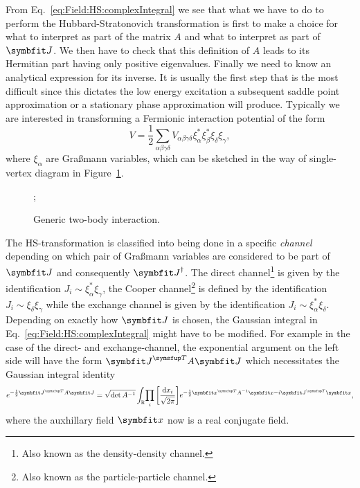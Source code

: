 From Eq.~\eqref{eq:Field:HS:complexIntegral} we see that
what we have to do to perform the Hubbard-Stratonovich transformation is first to make a choice for what to interpret as part
of the matrix $A$ and what to interpret as part of $\v{J}$. We then have to check that this definition of $A$ leads to its
Hermitian part having only positive eigenvalues. Finally we need to know an analytical expression for its inverse.
It is usually the first step that is the most difficult since this dictates the low energy excitation a subsequent saddle point
approximation or a stationary phase approximation will produce.
Typically we are interested in transforming a Fermionic interaction potential of the form
\begin{equation}
    \label{eq:Field:HS:typicalInteactionPotential}
    V = \frac{1}{2}\sum_{\alpha\beta\gamma\delta}V_{\alpha\beta\gamma\delta}\xi^\ast_\alpha\xi^\ast_\beta\xi_\delta\xi_\gamma,
\end{equation}
where $\xi_\alpha$ are Gra\ss mann variables, which can be sketched in the way of single-vertex diagram in Figure~\ref{fig:Field:HS:twoBodyInteraction}.
\begin{figure}[h]
    \begin{center}

;

    \end{center}
    \caption{Generic two-body interaction.}
    \label{fig:Field:HS:twoBodyInteraction}
\end{figure}
The HS-transformation is classified into being done in a specific \emph{channel} depending on which pair of Gra\ss mann variables are
considered to be part of $\v{J}$ and consequently $\v{J}^\dagger$. The direct channel\footnote{Also known as the density-density channel.} is given by 
the identification $J_i \sim \xi_\alpha^\ast\xi_\gamma$,
the Cooper channel\footnote{Also known as the particle-particle channel.} is defined by the identification $J_i \sim \xi_\delta\xi_\gamma$ while the
exchange channel is given by the identification $J_i \sim \xi_\alpha^\ast\xi_\delta$. Depending on exactly how $\v{J}$ is chosen, the Gaussian
integral in Eq.~\eqref{eq:Field:HS:complexIntegral} might have to be modified. For example in the case of the direct- and exchange-channel, the
exponential argument on the left side will have the form $\v{J}^\trans A\v{J}$ which necessitates the Gaussian integral identity
\begin{equation}
    \label{eq:Field:HS:realIntegral}
    e^{-\frac{1}{2}\v{J}^\trans A\v{J}} = \sqrt{\det A^{-1}}\int_{\mathbb{R}}\!\prod_i\bigg[\frac{\mathrm{d}x_i}{\sqrt{2\pi}}\bigg]e^{-\frac{1}{2}\v{x}^\trans A^{-1}\v{x} - i\v{J}^\trans\v{x}},
\end{equation}
where the auxhillary field $\v{x}$ now is a real conjugate field.


